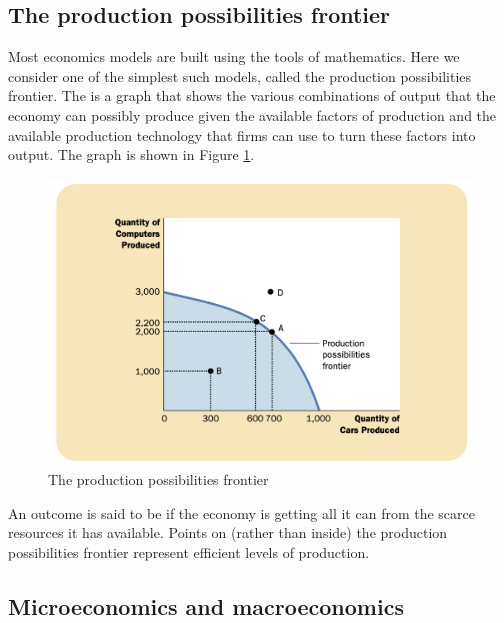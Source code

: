 \subsection{The production possibilities frontier}

Most economics models are built using the tools of mathematics.
Here we consider one of the simplest such models, called the production possibilities frontier.
The  is a graph that shows the various combinations of output that the economy can possibly produce given the available factors of production and the available production technology that firms can use to turn these factors into output. The graph is shown in Figure \ref{fig:the-production-possibilities-frontier}.



\begin{figure}[!ht]
  \centering
  \includegraphics[width=\textwidth]{pics/the-production-possibilities-frontier}
  \caption{The production possibilities frontier}
  \label{fig:the-production-possibilities-frontier}
\end{figure}



An outcome is said to be  if the economy is getting all it can from the scarce resources it has available.
Points on (rather than inside) the production possibilities frontier represent efficient levels of production.



\subsection{Microeconomics and macroeconomics}

